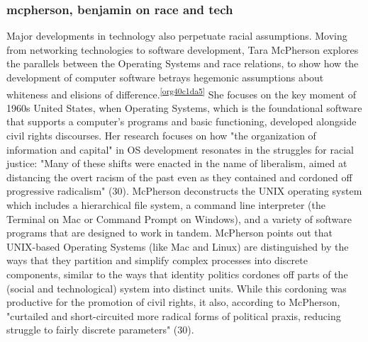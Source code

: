 \documentclass[11pt]{article}
\begin{document}
\subsubsection{mcpherson, benjamin on race and tech}
\label{sec:orgd8f310a}
Major developments in technology also perpetuate racial
assumptions. Moving from networking technologies to software
development, Tara McPherson explores the parallels between the
Operating Systems and race relations, to show how the development of
computer software betrays hegemonic assumptions about whiteness and
elisions of difference.\textsuperscript{\ref{org40c1da5}} She focuses on the key moment of 1960s
United States, when Operating Systems, which is the foundational
software that supports a computer's programs and basic functioning,
developed alongside civil rights discourses. Her research focuses on
how "the organization of information and capital" in OS development
resonates in the struggles for racial justice: "Many of these shifts
were enacted in the name of liberalism, aimed at distancing the overt
racism of the past even as they contained and cordoned off progressive
radicalism" (30). McPherson deconstructs the UNIX operating system
which includes a hierarchical file system, a command line interpreter
(the Terminal on Mac or Command Prompt on Windows), and a variety of
software programs that are designed to work in tandem. McPherson
points out that UNIX-based Operating Systems (like Mac and Linux) are
distinguished by the ways that they partition and simplify complex
processes into discrete components, similar to the ways that identity
politics cordones off parts of the (social and technological) system
into distinct units. While this cordoning was productive for the
promotion of civil rights, it also, according to McPherson, "curtailed
and short-circuited more radical forms of political praxis, reducing
struggle to fairly discrete parameters" (30).
\end{document}
